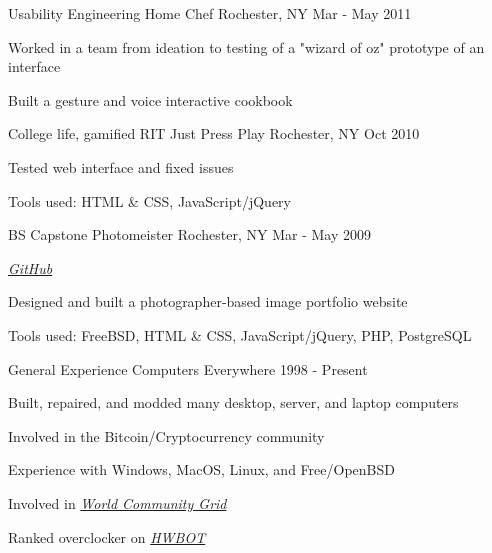 \begin{cventries}
  \cventry
    {Usability Engineering} %
    {Home Chef} %
    {Rochester, NY} %
    {Mar - May 2011} %
    {
      \begin{cvitems} %
        \item {Worked in a team from ideation to testing of a "wizard of oz" prototype of an interface}
        \item {Built a gesture and voice interactive cookbook}
      \end{cvitems}
    }

  \cventry
    {College life, gamified} %
    {RIT Just Press Play} %
    {Rochester, NY} %
    {Oct 2010} %
    {
      \begin{cvitems} %
        \item {Tested web interface and fixed issues}
        \item {Tools used: HTML \& CSS, JavaScript/jQuery}
      \end{cvitems}
    }


  \cventry
    {BS Capstone} %
    {Photomeister} %
    {Rochester, NY} %
    {Mar - May 2009} %
    {
      \begin{cvitems} %
        \item {\emph{\href{https://github.com/desnudopenguino/photomeister}{GitHub}}}
        \item {Designed and built a photographer-based image portfolio website}
        \item {Tools used: FreeBSD, HTML \& CSS, JavaScript/jQuery, PHP, PostgreSQL}
      \end{cvitems}
    }


  \cventry
    {General Experience} %
    {Computers} %
    {Everywhere} %
    {1998 - Present} %
    {
      \begin{cvitems} %
        \item {Built, repaired, and modded many desktop, server, and laptop computers}
        \item {Involved in the Bitcoin/Cryptocurrency community}
        \item {Experience with Windows, MacOS, Linux, and Free/OpenBSD}
        \item {Involved in \emph{\href{https://www.worldcommunitygrid.org/stats/viewMemberInfo.do?userName=desnudopenguino}{World Community Grid}}}
        \item {Ranked overclocker on \emph{\href{https://hwbot.org/user/desnudopenguino/}{HWBOT}}}
      \end{cvitems}
   }

\end{cventries}

